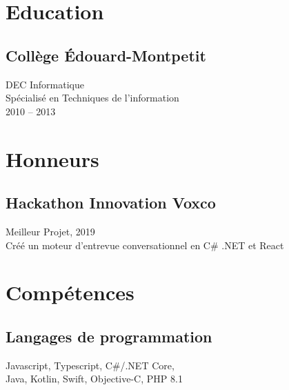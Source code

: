 \documentclass{article}
\begin{document}
\setlength{\columnsep}{4em}
\setlength{\columnseprule}{0.4pt}
\begin{paracol}{2}
  \begin{leftcolumn}
    \vspace{-2.5em}
    \section{Education}

    \subsection{Collège Édouard-Montpetit}
    DEC Informatique \\
    Spécialisé en Techniques de l'information \\
    2010 -- 2013

    \section{Honneurs}

    \subsection{Hackathon Innovation Voxco}
    \faAward\hspace{0.5em}Meilleur Projet, 2019 \\
    Créé un moteur d'entrevue conversationnel en C\# .NET et React \\

    \section{Compétences}

    \subsection{Langages de programmation}
    Javascript, Typescript, C\#/.NET Core,\\
    Java, Kotlin, Swift, Objective-C, PHP 8.1

    \vspace{0.5em}


\end{leftcolumn}
\end{paracol}
\end{document}
